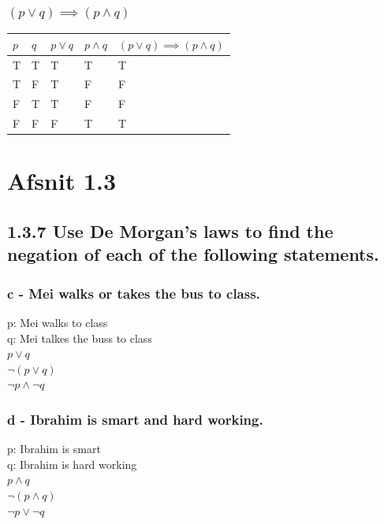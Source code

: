 \documentclass[12pt, a4paper]{report}
\begin{document}
\setcounter{subsubsection}{3}
				\subsubsection{$(p\lor q)\implies (p\land q)$}
					\begin{table}[h!]
						\begin{tabular}{|l|l|l|l|l|}
						\hline
						$p$ & $q$ & $p\lor q$ & $p \land q$ & $(p\lor q) \implies (p\land q)$ \\ \hline
						T   & T   & T         & T           & T                               \\ \hline
						T   & F   & T         & F           & F                               \\ \hline
						F   & T   & T         & F           & F                               \\ \hline
						F   & F   & F         & T           & T                               \\ \hline
						\end{tabular}
					\end{table}
		\section{Afsnit 1.3}
			\setcounter{subsection}{6}
			\subsection{1.3.7 Use De Morgan’s laws to find the negation of each of the following statements.}
			
\setcounter{subsubsection}{2}

				\subsubsection{c - Mei walks or takes the bus to class.}
					p: Mei walks to class\\
					q: Mei talkes the buss to class\\
					$p \lor q$\\
					$\neg( p \lor q)$\\
					$\neg p \land \neg q$
				\subsubsection{d - Ibrahim is smart and hard working.}
					p:  Ibrahim is smart\\
					q:  Ibrahim is hard working\\
					$p \land q$\\
					$\neg( p \land q)$\\
					$\neg p \lor \neg q$
\end{document}

